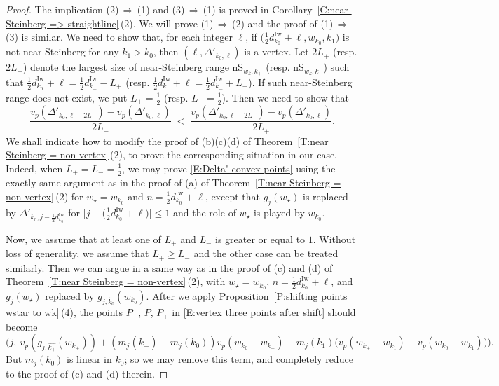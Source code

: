 \documentclass[12pt]{amsart}
\theoremstyle{definition}
\numberwithin{equation}{subsection}
\newcommand{\Iw}{\mathrm{Iw}}
\newcommand{\nS}{\mathrm{nS}}
\begin{document}
\begin{proof}
The implication (2)$\,\Rightarrow\,$(1) and (3)$\,\Rightarrow\,$(1) is proved in Corollary~\ref{C:near-Steinberg => straightline}\,(2). We will prove (1)$\,\Rightarrow\,$(2) and the proof of (1)$\,\Rightarrow\,$(3) is similar.
We need to show that, for each integer $\ell$, if $\big(\frac 12d_{k_0}^\Iw + \ell, w_{k_0}, k_1\big)$ is not  near-Steinberg for any $k_1 > {k_0}$, then $(\ell, \Delta'_{{k_0}, \ell})$ is a vertex. Let $2L_+$ (resp. $2L_-$) denote the largest size of near-Steinberg range $\nS_{w_k, k_+}$ (resp. $\nS_{w_k, k_-}$) such that $\frac 12d_{k_0}^\Iw+\ell = \frac 12d_{k_+}^\Iw-L_+$ (resp. $\frac 12d_k^\Iw+\ell = \frac 12d_{k_-}^\Iw+L_-$). If such near-Steinberg range does not exist, we put $L_+ = \frac 12$ (resp. $L_- = \frac 12$).
Then we need to show that
\begin{equation}
\label{E:Delta' convex points}
\frac{v_p(\Delta'_{k_0, \ell - 2L_-}) - v_p(\Delta'_{k_0, \ell})}{2L_-} \;<\; \frac{v_p(\Delta'_{k_0, \ell + 2L_+})-v_p(\Delta'_{k_0, \ell}) }{2L_+}.
\end{equation}
We shall indicate how to modify the proof of (b)(c)(d) of Theorem~\ref{T:near Steinberg = non-vertex}\,(2), to prove the corresponding situation in our case.
Indeed, when $L_+ = L_-=\frac 12$, we may prove \eqref{E:Delta' convex points} using the exactly same argument as in the proof of (a) of Theorem~\ref{T:near Steinberg = non-vertex}\,(2) for $w_\star = w_{k_0}$ and $n = \frac 12d_{k_0}^\Iw+\ell$, except that $g_j(w_\star)$ is replaced by $\Delta'_{k_0, j - \frac 12 d_{k_0}^\Iw}$ for $\big|j -\big(\frac 12 d_{k_0}^\Iw+\ell\big)\big| \leq 1$ and the role of $w_\star$ is played by $w_{k_0}$.

Now, we assume that at least one of $L_+$ and $L_-$ is greater or equal to $1$. Without loss of generality, we assume that $L_+ \geq L_-$ and the other case can be treated similarly. Then we can argue in a same way as in the proof of (c) and (d) of Theorem~\ref{T:near Steinberg = non-vertex}\,(2), with $w_\star = w_{k_0}$, $n = \frac 12d_{k_0}^\Iw+ \ell$, and $g_j(w_\star)$ replaced by $g_{j, \hat k_0}(w_{k_0})$. After we apply Proposition~\ref{P:shifting points wstar to wk}\,(4), the points $P_-$, $P$, $P_+$ in \eqref{E:vertex three points after shift} should become
\begin{equation}
\label{E:vertex three points after shift Delta} \Big( j,\ v_p(g_{j, \hat{ k_+}}(w_{k_+})) + (m_j(k_+)- m_j(k_0))v_p(w_{k_0}-w_{k_+}) - m_j(k_1)\big(v_p(w_{k_+}-w_{k_1})- v_p(w_{k_0}-w_{k_1})  \big)\Big).
\end{equation}
But $m_j(k_0)$ is linear in $k_0$; so we may remove this term, and completely reduce to the proof of (c) and (d) therein.
\end{proof}
\end{document}

